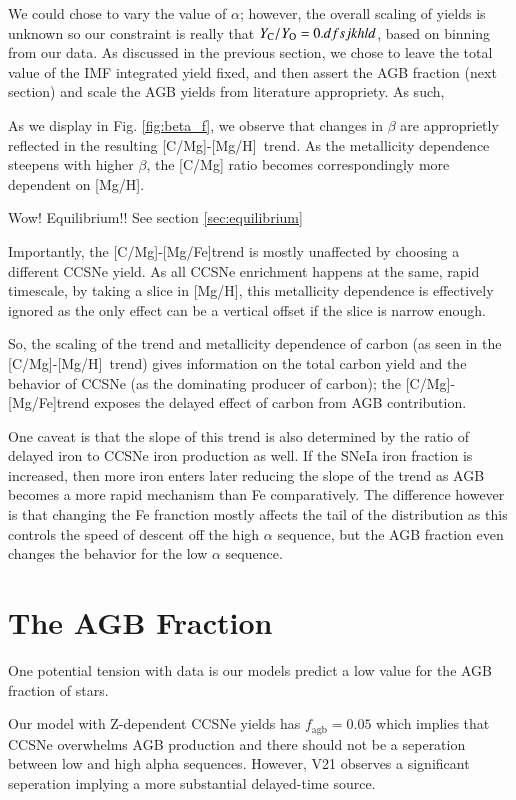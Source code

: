 \documentclass[12pt,oneside]{report}
\newcommand{\caah}{[C/Mg]-[Mg/H]}
\newcommand{\caafe}{[C/Mg]-[Mg/Fe]}
\begin{document}
We could chose to vary the value of $\alpha$; however, the overall scaling of
yields is unknown so our constraint is really that $Y_{\rm C}/Y_{\rm O} =
0.dfsjkhld$, based on binning from our data. As discussed in the previous
section, we chose to leave the total value of the IMF integrated yield fixed,
and then assert the AGB fraction (next section) and scale the AGB yields from
literature appropriety. As such, 

As we display in Fig. \ref{fig:beta_f}, we observe that changes in $\beta$ are
approprietly reflected in the resulting \caah~trend. As the metallicity
dependence steepens with higher $\beta$, the [C/Mg] ratio becomes
correspondingly more dependent on [Mg/H].

Wow! Equilibrium!! See section \ref{sec:equilibrium}

Importantly, the \caafe trend is mostly unaffected by choosing a different
CCSNe yield. As all CCSNe enrichment happens at the same, rapid timescale, by
taking a slice in [Mg/H], this metallicity dependence is effectively ignored as
the only effect can be a vertical offset if the slice is narrow enough. 

So, the scaling of the trend and metallicity dependence of carbon (as seen in
the \caah~trend) gives information on the total carbon yield and the behavior
of CCSNe (as the dominating producer of carbon);
the \caafe trend exposes the delayed effect of carbon from AGB contribution.

One caveat is that the slope of this trend is also determined by the ratio of delayed iron to CCSNe iron production as well. If the SNeIa iron fraction is increased, then more iron enters later reducing the slope of the trend as AGB becomes a more rapid mechanism than Fe comparatively. The difference however is that changing the Fe franction mostly affects the tail of the distribution as this controls the speed of descent off the high $\alpha$ sequence, but the AGB fraction even changes the behavior for the low $\alpha$ sequence.

\section{The AGB Fraction }
One potential tension with data is our models predict a low value for the AGB fraction of stars. 

Our model with Z-dependent CCSNe yields has $f_\text{agb} = 0.05$ which implies that CCSNe overwhelms AGB production and there should not be a seperation between low and high alpha sequences. However, V21 observes a significant seperation implying a more substantial delayed-time source. 
\end{document}
